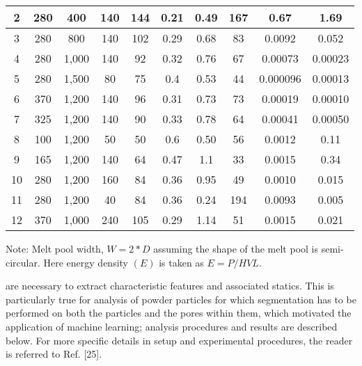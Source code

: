 \documentclass[10pt]{article}
\begin{document}
\begin{center}
\begin{tabular}{|c|c|c|c|c|c|c|c|c|c|}
\hline
2 & 280 & 400 & 140 & 144 & 0.21 & 0.49 & 167 & 0.67 & 1.69 \\
\hline
3 & 280 & 800 & 140 & 102 & 0.29 & 0.68 & 83 & 0.0092 & 0.052 \\
\hline
4 & 280 & 1,000 & 140 & 92 & 0.32 & 0.76 & 67 & 0.00073 & 0.00023 \\
\hline
5 & 280 & 1,500 & 80 & 75 & 0.4 & 0.53 & 44 & 0.000096 & 0.00013 \\
\hline
6 & 370 & 1,200 & 140 & 96 & 0.31 & 0.73 & 73 & 0.00019 & 0.00010 \\
\hline
7 & 325 & 1,200 & 140 & 90 & 0.33 & 0.78 & 64 & 0.00041 & 0.00050 \\
\hline
8 & 100 & 1,200 & 50 & 50 & 0.6 & 0.50 & 56 & 0.0012 & 0.11 \\
\hline
9 & 165 & 1,200 & 140 & 64 & 0.47 & 1.1 & 33 & 0.0015 & 0.34 \\
\hline
10 & 280 & 1,200 & 160 & 84 & 0.36 & 0.95 & 49 & 0.0010 & 0.015 \\
\hline
11 & 280 & 1,200 & 40 & 84 & 0.36 & 0.24 & 194 & 0.0093 & 0.005 \\
\hline
12 & 370 & 1,000 & 240 & 105 & 0.29 & 1.14 & 51 & 0.0015 & 0.021 \\
\hline
\end{tabular}
\end{center}

Note: Melt pool width, $W=2 * D$ assuming the shape of the melt pool is semi-circular. Here energy density $(E)$ is taken as $E=P / H V L$.

are necessary to extract characteristic features and associated statics. This is particularly true for analysis of powder particles for which segmentation has to be performed on both the particles and the pores within them, which motivated the application of machine learning; analysis procedures and results are described below. For more specific details in setup and experimental procedures, the reader is referred to Ref. [25].
\end{document}
